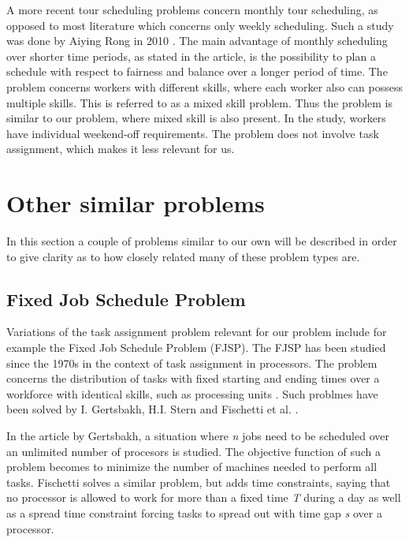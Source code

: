 A more recent tour scheduling problems concern monthly tour scheduling, as opposed to most literature which concerns only weekly scheduling. Such a study was done by Aiying Rong in 2010 \citet{rong_2010}. The main advantage of monthly scheduling over shorter time periods, as stated in the article, is the possibility to plan a schedule with respect to fairness and balance over a longer period of time. The problem concerns workers with different skills, where each worker also can possess multiple skills. This is referred to as a mixed skill problem. Thus the problem is similar to our problem, where mixed skill is also present. In the study, workers have individual weekend-off requirements. The problem does not involve task assignment, which makes it less relevant for us.

\section{Other similar problems}\label{other}
In this section a couple of problems similar to our own will be described in order to give clarity as to how closely related many of these problem types are.
\subsection{Fixed Job Schedule Problem}
Variations of the task assignment problem relevant for our problem include for example the Fixed Job Schedule Problem (FJSP). The FJSP has been studied since the 1970s in the context of task assignment in processors. The problem concerns the distribution of tasks with fixed starting and ending times over a workforce with identical skills, such as processing units \citet{krishnamoorthy_2011}. Such problmes have been solved by I. Gertsbakh, H.I. Stern \citet{gertsbakh_1977} and Fischetti et al. \citet{fischetti_1992}.

In the article \citet{gertsbakh_1977} by Gertsbakh, a situation where \textit{n} jobs need to be scheduled over an unlimited number of procesors is studied. The objective function of such a problem becomes to minimize the number of machines needed to perform all tasks. Fischetti solves a similar problem, but adds time constraints, saying that no processor is allowed to work for more than a fixed time \textit{T} during a day as well as a spread time constraint forcing tasks to spread out with time gap \textit{s} over a processor.

 	
